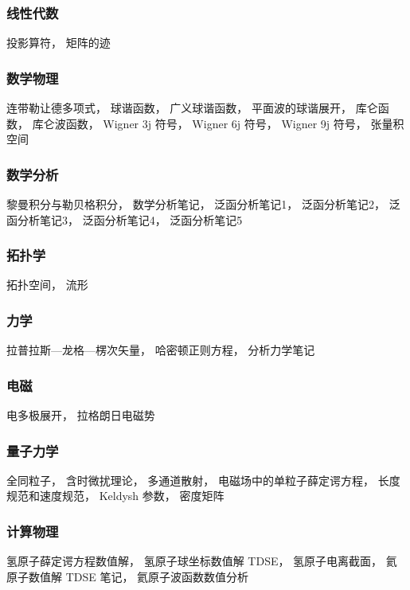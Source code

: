 
\subsubsection{线性代数}
投影算符， 矩阵的迹

\subsubsection{数学物理}
连带勒让德多项式， 球谐函数， 广义球谐函数， 平面波的球谐展开， 库仑函数， 库仑波函数， Wigner 3j 符号， Wigner 6j 符号， Wigner 9j 符号， 张量积空间

\subsubsection{数学分析}
黎曼积分与勒贝格积分， 数学分析笔记， 泛函分析笔记1， 泛函分析笔记2， 泛函分析笔记3， 泛函分析笔记4， 泛函分析笔记5

\subsubsection{拓扑学}
拓扑空间， 流形

\subsubsection{力学}
拉普拉斯—龙格—楞次矢量， 哈密顿正则方程， 分析力学笔记

\subsubsection{电磁}
电多极展开， 拉格朗日电磁势

\subsubsection{量子力学}
全同粒子， 含时微扰理论， 多通道散射， 电磁场中的单粒子薛定谔方程， 长度规范和速度规范， Keldysh 参数， 密度矩阵

\subsubsection{计算物理}
氢原子薛定谔方程数值解， 氢原子球坐标数值解 TDSE， 氢原子电离截面， 氦原子数值解 TDSE 笔记， 氦原子波函数数值分析
